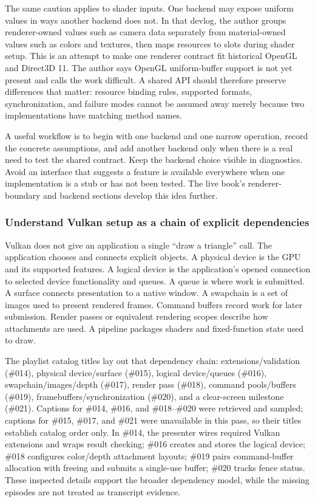 The same caution applies to shader inputs. One backend may expose uniform values in ways another backend does not. In that devlog, the author groups renderer-owned values such as camera data separately from material-owned values such as colors and textures, then maps resources to slots during shader setup. This is an attempt to make one renderer contract fit historical OpenGL and Direct3D 11. The author says OpenGL uniform-buffer support is not yet present and calls the work difficult. A shared API should therefore preserve differences that matter: resource binding rules, supported formats, synchronization, and failure modes cannot be assumed away merely because two implementations have matching method names.

A useful workflow is to begin with one backend and one narrow operation, record the concrete assumptions, and add another backend only when there is a real need to test the shared contract. Keep the backend choice visible in diagnostics. Avoid an interface that suggests a feature is available everywhere when one implementation is a stub or has not been tested. The live book's renderer-boundary and backend sections develop this idea further.

\subsubsection{Understand Vulkan setup as a chain of explicit dependencies}\label{understand-vulkan-setup-as-a-chain-of-explicit-dependencies}

Vulkan does not give an application a single ``draw a triangle'' call. The application chooses and connects explicit objects. A physical device is the GPU and its supported features. A logical device is the application's opened connection to selected device functionality and queues. A queue is where work is submitted. A surface connects presentation to a native window. A swapchain is a set of images used to present rendered frames. Command buffers record work for later submission. Render passes or equivalent rendering scopes describe how attachments are used. A pipeline packages shaders and fixed-function state used to draw.

The playlist catalog titles lay out that dependency chain: extensions/validation (\#014), physical device/surface (\#015), logical device/queues (\#016), swapchain/images/depth (\#017), render pass (\#018), command pools/buffers (\#019), framebuffers/synchronization (\#020), and a clear-screen milestone (\#021). Captions for \#014, \#016, and \#018--\#020 were retrieved and sampled; captions for \#015, \#017, and \#021 were unavailable in this pass, so their titles establish catalog order only. In \#014, the presenter wires required Vulkan extensions and wraps result checking; \#016 creates and stores the logical device; \#018 configures color/depth attachment layouts; \#019 pairs command-buffer allocation with freeing and submits a single-use buffer; \#020 tracks fence status. These inspected details support the broader dependency model, while the missing episodes are not treated as transcript evidence.

